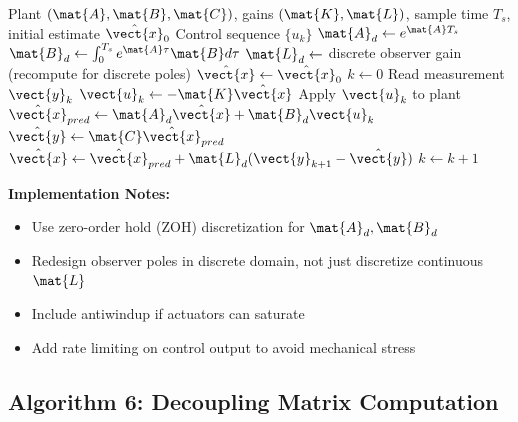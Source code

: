 \begin{algorithm}[H]
\caption{Observer-Based Controller (Discrete-Time Implementation)}
\label{alg:observer_controller}
\begin{algorithmic}[1]
\REQUIRE Plant $(\mat{A}, \mat{B}, \mat{C})$, gains $(\mat{K}, \mat{L})$, sample time $T_s$, initial estimate $\hat{\vect{x}}_0$
\ENSURE Control sequence $\{u_k\}$
\STATE
{}
\STATE $\mat{A}_d \gets e^{\mat{A}T_s}$
\STATE $\mat{B}_d \gets \int_0^{T_s} e^{\mat{A}\tau}\mat{B} d\tau$
\STATE $\mat{L}_d \gets $ discrete observer gain (recompute for discrete poles)
\STATE
{}
\STATE $\hat{\vect{x}} \gets \hat{\vect{x}}_0$
\STATE $k \gets 0$
\STATE
{}
    \STATE Read measurement $\vect{y}_k$
    \STATE
    \STATE $\vect{u}_k \gets -\mat{K}\hat{\vect{x}}$
    \STATE Apply $\vect{u}_k$ to plant
    \STATE
    \STATE $\hat{\vect{x}}_{pred} \gets \mat{A}_d\hat{\vect{x}} + \mat{B}_d\vect{u}_k$
    \STATE $\hat{\vect{y}} \gets \mat{C}\hat{\vect{x}}_{pred}$
    \STATE $\hat{\vect{x}} \gets \hat{\vect{x}}_{pred} + \mat{L}_d(\vect{y}_{k+1} - \hat{\vect{y}})$
    \STATE
    \STATE $k \gets k + 1$
\ENDWHILE
\end{algorithmic}
\end{algorithm}

\textbf{Implementation Notes:}
\begin{itemize}
    \item Use zero-order hold (ZOH) discretization for $\mat{A}_d, \mat{B}_d$
    \item Redesign observer poles in discrete domain, not just discretize continuous $\mat{L}$
    \item Include antiwindup if actuators can saturate
    \item Add rate limiting on control output to avoid mechanical stress
\end{itemize}

\subsection{Algorithm 6: Decoupling Matrix Computation}

